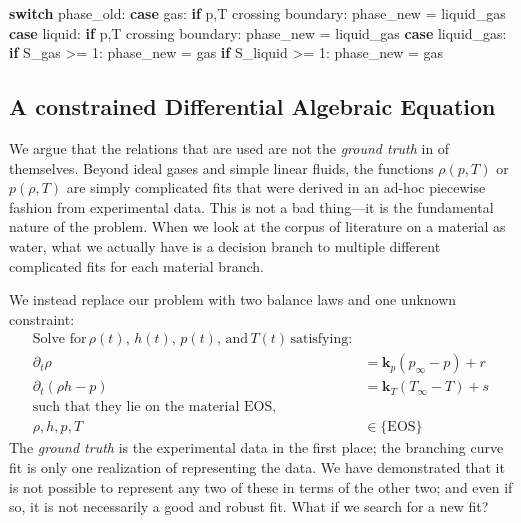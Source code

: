 \documentclass[]{article}
\newenvironment{Shaded}{}{}
\newcommand{\ControlFlowTok}[1]{\textcolor[rgb]{0.00,0.44,0.13}{\textbf{#1}}}
\newcommand{\DecValTok}[1]{\textcolor[rgb]{0.25,0.63,0.44}{#1}}
\newcommand{\NormalTok}[1]{#1}
\begin{document}
\begin{Shaded}
\begin{Highlighting}[]
\ControlFlowTok{switch}\NormalTok{ phase_old:}
  \ControlFlowTok{case}\NormalTok{ gas:}
    \ControlFlowTok{if}\NormalTok{ p,T crossing boundary:}
\NormalTok{      phase_new = liquid_gas}
  \ControlFlowTok{case}\NormalTok{ liquid:}
    \ControlFlowTok{if}\NormalTok{ p,T crossing boundary:}
\NormalTok{      phase_new = liquid_gas}
  \ControlFlowTok{case}\NormalTok{ liquid_gas:}
    \ControlFlowTok{if}\NormalTok{ S_gas >= }\DecValTok{1}\NormalTok{:}
\NormalTok{      phase_new = gas}
    \ControlFlowTok{if}\NormalTok{ S_liquid >= }\DecValTok{1}\NormalTok{:}
\NormalTok{      phase_new = gas}
\end{Highlighting}
\end{Shaded}

\hypertarget{header-n3262}{%
\subsection{A constrained Differential Algebraic
Equation}\label{header-n3262}}

We argue that the relations that are used are not the \emph{ground
truth} in of themselves. Beyond ideal gases and simple linear fluids,
the functions \(\rho(p,T)\) or \(p(\rho,T)\) are simply complicated fits
that were derived in an ad-hoc piecewise fashion from experimental data.
This is not a bad thing---it is the fundamental nature of the problem.
When we look at the corpus of literature on a material as water, what we
actually have is a decision branch to multiple different complicated
fits for each material branch.

We instead replace our problem with two balance laws and one unknown
constraint:
\begin{align}
\text{Solve for}\, \rho(t), \, h(t), \, p(t),\, \text{and}\, T(t)\, \text{satisfying:}\\
\partial_t \rho &  = \mathbf{k}_p(p_\infty - p) + r\\
\partial_t (\rho h-p) & = \mathbf{k}_T(T_\infty-T) + s \\
\text{such that they lie on the material EOS,}\\
\rho,h,p,T & \in \{\text{EOS}\}
\end{align}
The \emph{ground truth} is the experimental data in the first place; the
branching curve fit is only one realization of representing the data. We
have demonstrated that it is not possible to represent any two of these
in terms of the other two; and even if so, it is not necessarily a good
and robust fit. What if we search for a new fit?
\end{document}
